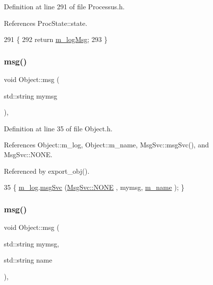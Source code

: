 Definition at line 291 of file Processus.\+h.



References Proc\+State\+::state.


\begin{DoxyCode}
291                       \{
292     \textcolor{keywordflow}{return} \hyperlink{classProcessus_a3bc0140a3a69a83951ab7f9986bd2c84}{m\_logMsg};
293   \}
\end{DoxyCode}
\mbox{\label{classObject_a58b2d0618c2d08cf2383012611528d97}} 
\subsubsection{\texorpdfstring{msg()}{msg()}\hspace{0.1cm}{\footnotesize\ttfamily [1/2]}}
{\footnotesize\ttfamily void Object\+::msg (\begin{DoxyParamCaption}\item[{std\+::string}]{mymsg }\end{DoxyParamCaption})\hspace{0.3cm}{\ttfamily [inline]}, {\ttfamily [inherited]}}



Definition at line 35 of file Object.\+h.



References Object\+::m\+\_\+log, Object\+::m\+\_\+name, Msg\+Svc\+::msg\+Svc(), and Msg\+Svc\+::\+N\+O\+NE.



Referenced by export\+\_\+obj().


\begin{DoxyCode}
35 \{ \hyperlink{classObject_a0d269813dd7ac1f24bc143031e2963f2}{m\_log}.\hyperlink{classMsgSvc_ad25f18047920cc59a314e5098259711c}{msgSvc} (\hyperlink{classMsgSvc_ae671eb7301996cd049d2da8a65925926a9be9ae32fed8e1e6eba4a58692210fbd}{MsgSvc::NONE}    , mymsg, \hyperlink{classObject_a8b83c95c705d2c3ba0d081fe1710f48d}{m\_name} ); \}
\end{DoxyCode}
\mbox{\label{classObject_ac5d59299273cee27aacf7de00d2e7034}} 
\subsubsection{\texorpdfstring{msg()}{msg()}\hspace{0.1cm}{\footnotesize\ttfamily [2/2]}}
{\footnotesize\ttfamily void Object\+::msg (\begin{DoxyParamCaption}\item[{std\+::string}]{mymsg,  }\item[{std\+::string}]{name }\end{DoxyParamCaption})\hspace{0.3cm}{\ttfamily [inline]}, {\ttfamily [inherited]}}



